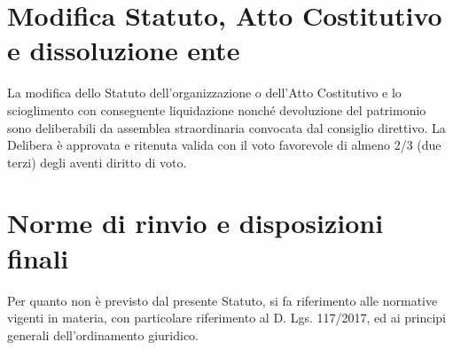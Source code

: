 \documentclass[legalpaper, 11pt]{exam}
\let\tempone\enumerate
\let\temptwo\endenumerate
\renewenvironment{enumerate}{\tempone\addtolength{\itemsep}{-0.45\baselineskip}}{\temptwo}
\begin{document}
\section{Modifica Statuto, Atto Costitutivo e dissoluzione ente}
\begin{enumerate}
\item La modifica dello Statuto dell'organizzazione o dell'Atto Costitutivo e lo scioglimento con conseguente liquidazione nonché devoluzione del patrimonio sono deliberabili da assemblea straordinaria convocata dal consiglio direttivo. La Delibera è approvata e ritenuta valida con il voto favorevole di almeno 2/3 (due terzi) degli aventi diritto di voto.
\end{enumerate}

\section{Norme di rinvio e disposizioni finali}
\begin{enumerate}
 \item Per quanto non è previsto dal presente Statuto, si fa riferimento alle normative vigenti in materia, con particolare riferimento al D. Lgs. 117/2017, ed ai principi generali dell'ordinamento giuridico.
\end{enumerate}
\end{document}
